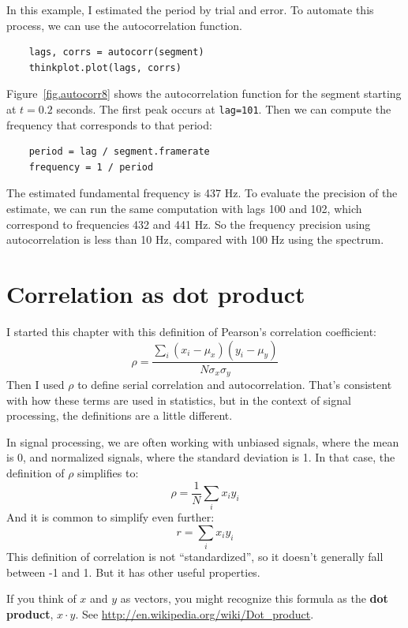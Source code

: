 \documentclass[12pt]{book}
\begin{document}
In this example, I estimated the period by trial and error.  To automate
this process, we can use the autocorrelation function.

\begin{verbatim}
    lags, corrs = autocorr(segment)
    thinkplot.plot(lags, corrs)
\end{verbatim}

Figure~\ref{fig.autocorr8} shows the autocorrelation function for
the segment starting at $t=0.2$ seconds.  The first peak occurs at
{\tt lag=101}.  Then we can compute the frequency that corresponds
to that period:

\begin{verbatim}
    period = lag / segment.framerate
    frequency = 1 / period
\end{verbatim}

The estimated fundamental frequency is 437 Hz.  To evaluate the
precision of the estimate, we can run the same computation with
lags 100 and 102, which correspond to frequencies 432 and 441 Hz.
So the frequency precision using autocorrelation is less than 10 Hz,
compared with 100 Hz using the spectrum.


\section{Correlation as dot product}

I started this chapter with this definition of Pearson's
correlation coefficient:
%
\[ \rho = \frac{ \sum_i (x_i - \mu_x) (y_i - \mu_y)}{N \sigma_x \sigma_y} \]
%
Then I used $\rho$ to define serial correlation and autocorrelation.
That's consistent with how these terms are used in statistics,
but in the context of signal processing, the definitions are
a little different.

In signal processing, we are often working with unbiased signals,
where the mean is 0, and normalized signals, where the standard
deviation is 1.  In that case, the definition of $\rho$ simplifies to:
%
\[ \rho = \frac{1}{N} \sum_i x_i y_i \]
%
And it is common to simplify even further:
%
\[ r = \sum_i x_i y_i \]
%
This definition of correlation is not ``standardized'', so it doesn't
generally fall between -1 and 1.  But it has other useful properties.

If you think of $x$ and $y$ as vectors, you might recognize this
formula as the {\bf dot product}, $x \cdot y$.  See
\url{http://en.wikipedia.org/wiki/Dot_product}.

\newcommand{\norm}{\mathrm{norm}}
\end{document}
